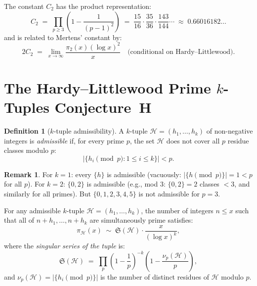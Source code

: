 \documentclass[12pt,a4paper]{amsart}
\theoremstyle{definition}
\newtheorem{definition}[theorem]{Definition}
\newtheorem{remark}[theorem]{Remark}
\begin{document}
The constant $C_2$ has the product representation:
\[
  C_2 \;=\; \prod_{p \geq 3} \left(1 - \frac{1}{(p-1)^2}\right)
  \;=\; \frac{15}{16} \cdot \frac{35}{36} \cdot \frac{143}{144} \cdots
  \;\approx\; 0.66016182\ldots
\]
and is related to Mertens' constant by:
\[
  2 C_2 \;=\; \lim_{x \to \infty} \frac{\pi_2(x) (\log x)^2}{x}
  \quad \text{(conditional on Hardy--Littlewood)}.
\]

\section{The Hardy--Littlewood Prime $k$-Tuples Conjecture~$\mathbf{H}$}
\label{sec:ktuples}

\begin{definition}[$k$-tuple admissibility]
  A $k$-tuple $\mathcal{H} = (h_1, \ldots, h_k)$ of non-negative integers
  is \emph{admissible} if, for every prime $p$, the set $\mathcal{H}$ does
  not cover all $p$ residue classes modulo $p$:
  \[
    \bigl|\{h_i \pmod p : 1 \leq i \leq k\}\bigr| < p.
  \]
\end{definition}

\begin{remark}
  For $k = 1$: every $\{h\}$ is admissible (vacuously: $|\{h \pmod p\}| = 1 < p$
  for all $p$).  For $k = 2$: $\{0, 2\}$ is admissible (e.g., mod 3:
  $\{0, 2\} = 2$ classes $< 3$, and similarly for all primes).
  But $\{0, 1, 2, 3, 4, 5\}$ is not admissible for $p = 3$.
\end{remark}

\begin{conjecture}\label{conj:H}
  For any admissible $k$-tuple $\mathcal{H} = (h_1, \ldots, h_k)$,
  the number of integers $n \leq x$ such that all of
  $n + h_1, \ldots, n + h_k$ are simultaneously prime satisfies:
  \[
    \pi_{\mathcal{H}}(x)
    \;\sim\; \mathfrak{S}(\mathcal{H}) \cdot \frac{x}{(\log x)^k},
  \]
  where the \emph{singular series of the tuple} is:
  \[
    \mathfrak{S}(\mathcal{H})
    \;=\; \prod_p \left(1 - \frac{1}{p}\right)^{-k}
              \left(1 - \frac{\nu_p(\mathcal{H})}{p}\right),
  \]
  and $\nu_p(\mathcal{H}) = |\{h_i \pmod p\}|$ is the number of
  distinct residues of $\mathcal{H}$ modulo $p$.
\end{conjecture}
\end{document}
